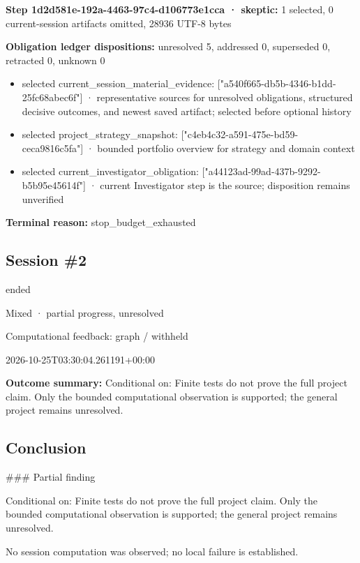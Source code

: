 \documentclass[11pt]{article}
\begin{document}
\textbf{Step 1d2d581e-192a-4463-97c4-d106773e1cca · skeptic:} 1 selected, 0 current-session artifacts omitted, 28936 UTF-8 bytes\par
\textbf{Obligation ledger dispositions:} unresolved 5, addressed 0, superseded 0, retracted 0, unknown 0\par
\begin{itemize}
\item selected current\_session\_material\_evidence: ["a540f665-db5b-4346-b1dd-25fc68abec6f"] · representative sources for unresolved obligations, structured decisive outcomes, and newest saved artifact; selected before optional history
\item selected project\_strategy\_snapshot: ["c4eb4c32-a591-475e-bd59-ceca9816c5fa"] · bounded portfolio overview for strategy and domain context
\item selected current\_investigator\_obligation: ["a44123ad-99ad-437b-9292-b5b95e45614f"] · current Investigator step is the source; disposition remains unverified
\end{itemize}
\textbf{Terminal reason:} stop\_budget\_exhausted\par
\subsection{Session \#2}
\begin{description}[style=nextline,font=\normalfont\bfseries,leftmargin=0pt,labelsep=0pt]
\item[Execution status] ended
\item[Outcome] Mixed · partial progress, unresolved
\item[Strategy] Computational feedback: graph / withheld
\item[Started] 2026-10-25T03:30:04.261191+00:00
\end{description}
\textbf{Outcome summary:} Conditional on: Finite tests do not prove the full project claim. Only the bounded computational observation is supported; the general project remains unresolved.\par
\subsection{Conclusion}
\#\#\# Partial finding

Conditional on: Finite tests do not prove the full project claim. Only the bounded computational observation is supported; the general project remains unresolved.

No session computation was observed; no local failure is established.
\end{document}
